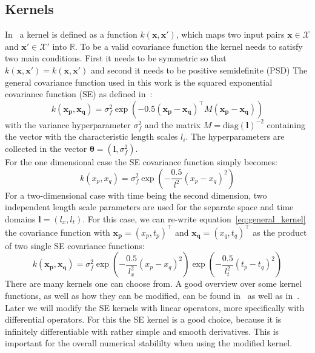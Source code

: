 \documentclass{article}
\begin{document}
\subsection{Kernels}
In~\cite{RasmussenCarlEdward} a kernel is defined as a function
$k(\bm{x},\bm{x'})$, which maps two input pairs $\bm{x} \in \mathcal{X}$ and
$\bm{x'} \in \mathcal{X'}$ into $\mathbb{R}$. To be a valid covariance function
the kernel needs to satisfy two main conditions. First it needs to be symmetric
so that $k(\bm{x,x'}) = k(\bm{x,x'})$ and second it needs to be positive
semidefinite (PSD) The general covariance function used in this work is the
squared exponential covariance function (SE) as defined
in~\cite{RasmussenCarlEdward}:
\begin{equation}
    k(\bm{x_p}, \bm{x_q}) = \sigma_f^2  \exp({-0.5{(\bm{x_p}-\bm{x_q} )}^\intercal M (\bm{x_p}- \bm{x_q})})
\end{equation}
with the variance hyperparameter $\sigma_f^2$ and the matrix $M = {\mathrm{diag}(\bm{l})}^{-2}$ containing the vector with the characteristic length scales $l_i$. The hyperparameters are collected in the vector $\bm{\theta} = (\bm{l},\sigma_f^2)$. \\
For the one dimensional case the SE covariance function simply becomes:
\begin{equation}
    k(x_p, x_q) = \sigma_f^2  \exp\left({-\frac{0.5}{l^2} {(x_p-x_q)}^2}\right)
\end{equation}
For a two-dimensional case with time being the second dimension, two independent length scale parameters are used for the separate space and time domains $\bm{l} = (l_x,l_t)$. For this case, we can re-write equation~\ref{eq:general_kernel} the covariance function with $\bm{x_p} = {(x_p, t_p)}^\intercal$ and  $\bm{x_q} = {(x_q, t_q)}^\intercal$ as the product of two single SE covariance functions:
\begin{equation}
    k(\bm{x_p}, \bm{x_q}) = \sigma_f^2  \exp\left({-\frac{0.5}{l_x^2} {(x_p-x_q)}^2}\right) \exp\left({-\frac{0.5}{l_t^2} {(t_p-t_q)}^2}\right)
\end{equation}
There are many kernels one can choose from. A good overview over some kernel functions, as well as how they can be modified, can be found in~\cite{Duvenaud} as well as in~\cite{görtler2019a}. Later we will modify the SE kernels with linear operators, more specifically with differential operators. For this the SE kernel is a good choice, because it is infinitely differentiable with rather simple and smooth derivatives. This is important for the overall numerical stabililty when using the modified kernel. 
\end{document}
